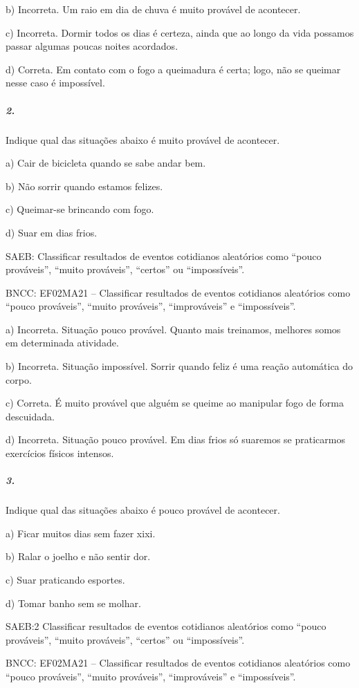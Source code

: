 b) Incorreta. Um raio em dia de chuva é muito provável de acontecer.

c) Incorreta. Dormir todos os dias é certeza, ainda que ao longo da vida
possamos passar algumas poucas noites acordados.

d) Correta. Em contato com o fogo a queimadura é certa; logo, não se queimar nesse caso é impossível.

\subparagraph{2.}\label{section-76}

Indique qual das situações abaixo é muito provável de acontecer.

a) Cair de bicicleta quando se sabe andar bem.

b) Não sorrir quando estamos felizes.

c) Queimar-se brincando com fogo.

d) Suar em dias frios.

SAEB: Classificar resultados de eventos cotidianos aleatórios como ``pouco prováveis'', ``muito prováveis'', ``certos'' ou
``impossíveis''.

BNCC: EF02MA21 -- Classificar resultados de eventos cotidianos aleatórios
como ``pouco prováveis'', ``muito prováveis'', ``improváveis'' e ``impossíveis''.

a) Incorreta. Situação pouco provável. Quanto mais treinamos, melhores somos em determinada atividade.

b) Incorreta. Situação impossível. Sorrir quando feliz é uma reação
automática do corpo.

c) Correta. É muito provável que alguém se queime ao manipular fogo de
forma descuidada.

d) Incorreta. Situação pouco provável. Em dias frios só suaremos se
praticarmos exercícios físicos intensos.

\subparagraph{3.}\label{section-77}

Indique qual das situações abaixo é pouco provável de acontecer.

a) Ficar muitos dias sem fazer xixi.

b) Ralar o joelho e não sentir dor.

c) Suar praticando esportes.

d) Tomar banho sem se molhar.

SAEB:2 Classificar resultados de eventos cotidianos aleatórios
como ``pouco prováveis'', ``muito prováveis'', ``certos'' ou
``impossíveis''.

BNCC: EF02MA21 -- Classificar resultados de eventos cotidianos aleatórios
como ``pouco prováveis'', ``muito prováveis'', ``improváveis'' e ``impossíveis''.

